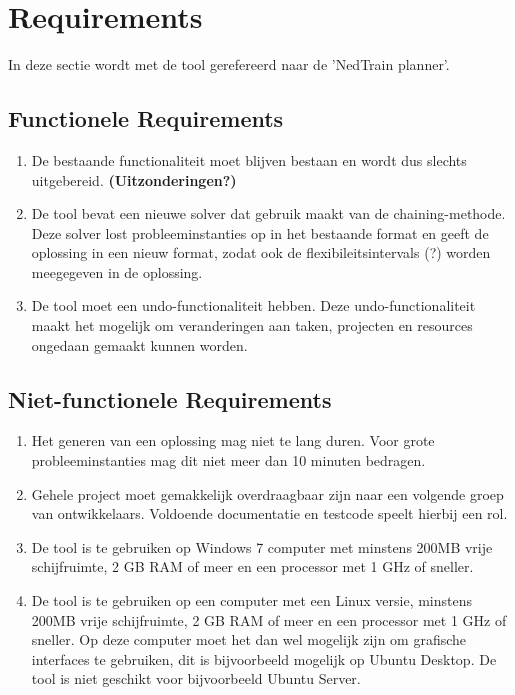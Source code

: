 \section{Requirements}
In deze sectie wordt met de tool gerefereerd naar de 'NedTrain planner'.

\subsection{Functionele Requirements}
\begin{enumerate}
    \item De bestaande functionaliteit moet blijven bestaan en wordt dus slechts uitgebereid. \textbf{(Uitzonderingen?)}
    \item De tool bevat een nieuwe solver dat gebruik maakt van de chaining-methode. Deze solver lost probleeminstanties op in het bestaande format en geeft de oplossing in een nieuw format, zodat ook de flexibileitsintervals (?) worden meegegeven in de oplossing. 
    \item De tool moet een undo-functionaliteit hebben. Deze undo-functionaliteit maakt het mogelijk om veranderingen aan taken, projecten en resources ongedaan gemaakt kunnen worden. 
\end{enumerate}

\subsection{Niet-functionele Requirements}
\begin{enumerate}
    \item Het generen van een oplossing mag niet te lang duren. Voor grote probleeminstanties mag dit niet meer dan 10 minuten bedragen. 
    \item Gehele project moet gemakkelijk overdraagbaar zijn naar een volgende groep van ontwikkelaars. Voldoende documentatie en testcode speelt hierbij een rol.
    \item De tool is te gebruiken op Windows 7 computer met minstens 200MB vrije schijfruimte, 2 GB RAM of meer en een processor met 1 GHz of sneller.
    \item De tool is te gebruiken op een computer met een Linux versie, minstens 200MB vrije schijfruimte, 2 GB RAM of meer en een processor met 1 GHz of sneller. Op deze computer moet het dan wel mogelijk zijn om grafische interfaces te gebruiken, dit is bijvoorbeeld mogelijk op Ubuntu Desktop. De tool is niet geschikt voor bijvoorbeeld Ubuntu Server. 
\end{enumerate}
